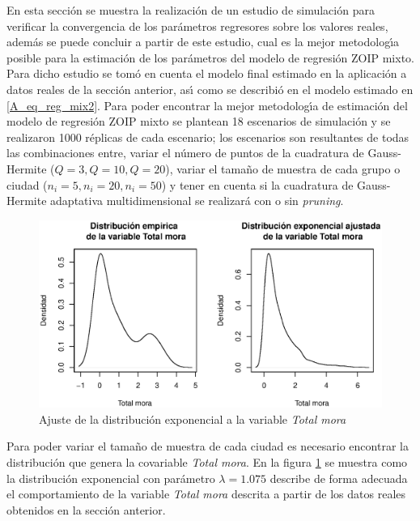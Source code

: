 En esta secci\'{o}n se muestra la realizaci\'{o}n de un estudio de simulaci\'{o}n para verificar la convergencia de los par\'{a}metros regresores sobre los valores reales, adem\'{a}s se puede concluir a partir de este estudio, cual es la mejor metodolog\'{\i}a posible para la estimaci\'{o}n de los par\'{a}metros del modelo de regresi\'{o}n ZOIP mixto. Para dicho estudio se tom\'{o} en cuenta el modelo final estimado en la aplicaci\'{o}n a datos reales de la secci\'{o}n anterior, as\'{\i} como se describi\'{o} en el modelo estimado en \eqref{A_eq_reg_mix2}. Para poder encontrar la mejor metodolog\'{\i}a de estimaci\'{o}n del modelo de regresi\'{o}n ZOIP mixto se plantean 18 escenarios de simulaci\'{o}n y se realizaron 1000 r\'{e}plicas de cada escenario; los escenarios son resultantes de todas las combinaciones entre, variar el n\'{u}mero de puntos de la cuadratura de Gauss-Hermite ($Q=3 , Q=10, Q=20$), variar el tama\~{n}o de muestra de cada grupo o ciudad ($n_i=5, n_i=20, n_i=50$) y tener en cuenta si la cuadratura de Gauss-Hermite adaptativa multidimensional se realizar\'{a} con o sin \textit{pruning}.\\

\begin{figure}
	\begin{center}
		\includegraphics[scale=0.6]{Ajuste_expo_mix.eps}	
		\caption{Ajuste de la distribuci\'{o}n exponencial a la variable \textsl{Total mora}}
		\label{Ajuste_expo_mix}
	\end{center}
\end{figure}

Para poder variar el tama\~{n}o de muestra de cada ciudad es necesario encontrar la distribuci\'{o}n que genera la covariable \textsl{Total mora}. En la figura \ref{Ajuste_expo_mix} se muestra como la distribuci\'{o}n exponencial con par\'{a}metro $\lambda=1.075$ describe de forma adecuada el comportamiento de la variable \textsl{Total mora} descrita a partir de los datos reales obtenidos en la secci\'{o}n anterior.\\

